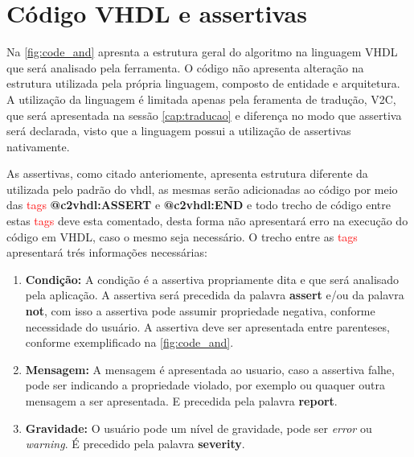 \section{\label{cap:vhdl_assertivas}Código VHDL e assertivas}
\par
Na \autoref{fig:code_and} apresnta a estrutura geral do algoritmo na linguagem VHDL que será analisado pela ferramenta. O código não apresenta alteração na estrutura utilizada pela própria linguagem, composto de entidade e arquitetura. A utilização da linguagem é limitada apenas pela feramenta de tradução, V2C, que será apresentada na sessão \autoref{cap:traducao} e diferença no modo que assertiva será declarada, visto que a linguagem possui a utilização de assertivas nativamente.

\par
As assertivas, como citado anteriomente, apresenta estrutura diferente da utilizada pelo padrão do vhdl, as mesmas serão adicionadas ao código por meio das \textcolor{red}{tags} \textbf{@c2vhdl:ASSERT} e \textbf{@c2vhdl:END} e todo trecho de código entre estas \textcolor{red}{tags} deve esta comentado, desta forma não apresentará erro na execução do código em VHDL, caso o mesmo seja necessário. O trecho entre as \textcolor{red}{tags} apresentará trés informações necessárias:
\begin{enumerate}
\item \textbf{Condição:} A condição é a assertiva propriamente dita e que será analisado pela aplicação. A assertiva será precedida da palavra \textbf{assert} e/ou da palavra \textbf{not}, com isso a assertiva pode assumir propriedade negativa, conforme necessidade do usuário. A assertiva deve ser apresentada entre parenteses, conforme exemplificado na \autoref{fig:code_and}.
\item \textbf{Mensagem:} A mensagem é apresentada ao usuario, caso a assertiva falhe, pode ser indicando a propriedade violado, por exemplo ou quaquer outra mensagem a ser apresentada. E precedida pela palavra \textbf{report}.
\item \textbf{Gravidade:} O usuário pode um nível de gravidade, pode ser \textit{error} ou \textit{warning}. É precedido pela palavra \textbf{severity}.
\end{enumerate}


